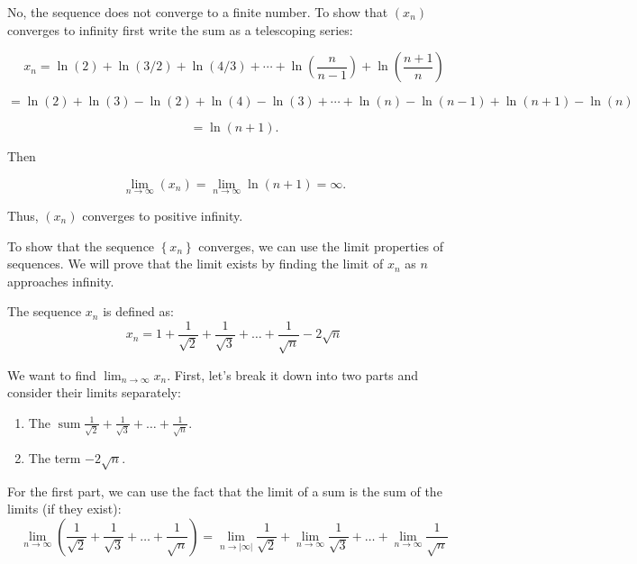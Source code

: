 \documentclass{report}
\begin{document}
\bigskip
\pagebreak
{}


\begin{myproof}

  No, the sequence does not converge to a finite number. To show that $(x_n)$ converges to infinity first write the sum as a telescoping series:

$$ x_n = \ln(2) + \ln(3/2) + \ln(4/3) + \cdots + \ln\left( \frac{n}{n-1}\right) + \ln\left(\frac{n +1}{n}\right) $$

$$  = \ln(2) + \ln(3) - \ln(2) + \ln(4) - \ln(3) + \cdots + \ln(n) - \ln(n-1) + \ln(n+1) - \ln(n) $$

$$  =  \ln(n+1).$$

Then


$$ \lim_{n \rightarrow   \infty} (x_n)= \lim_{n \rightarrow \infty} \ln(n+1) = \infty.$$

Thus, $(x_n)$ converges to positive infinity.


\end{myproof}

\bigskip
{}


To show that the sequence $\left\{x_n\right\}$ converges, we can use the limit properties of sequences. We will prove that the limit exists by finding the limit of $x_n$ as $n$ approaches infinity.

The sequence $x_n$ is defined as:
$$
x_n=1+\frac{1}{\sqrt{2}}+\frac{1}{\sqrt{3}}+\ldots+\frac{1}{\sqrt{n}}-2 \sqrt{n}
$$

We want to find $\lim _{n \rightarrow \infty} x_n$. First, let's break it down into two parts and consider their limits separately:



\begin{enumerate}

  \item The $\operatorname{sum} \frac{1}{\sqrt{2}}+\frac{1}{\sqrt{3}}+\ldots+\frac{1}{\sqrt{n}}$.
    \item The term $-2 \sqrt{n}$.
    
\end{enumerate}

For the first part, we can use the fact that the limit of a sum is the sum of the limits (if they exist):
$$
\lim _{n \rightarrow \infty}\left(\frac{1}{\sqrt{2}}+\frac{1}{\sqrt{3}}+\ldots+\frac{1}{\sqrt{n}}\right)=\lim _{n \rightarrow|\infty|} \frac{1}{\sqrt{2}}+\lim _{n \rightarrow \infty} \frac{1}{\sqrt{3}}+\ldots+\lim _{n \rightarrow \infty} \frac{1}{\sqrt{n}}
$$
\end{document}

